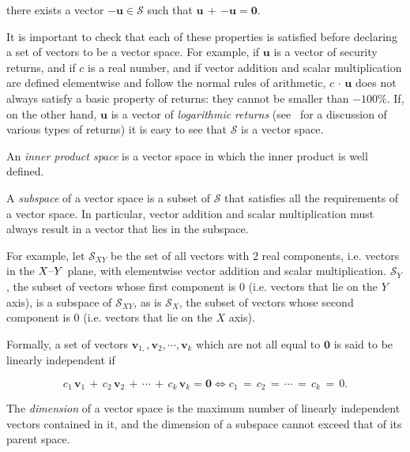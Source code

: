 \documentclass[graybox,envcountchap,sectrefs]{svmono}\usepackage[]{graphicx}\usepackage[]{xcolor}
\makeatletter
\newcommand{\lyxmathsym}[1]{\ifmmode\begingroup\def\b@ld{bold}
  \text{\ifx\math@version\b@ld\bfseries\fi#1}\endgroup\else#1\fi}
\makeatother
\begin{document}
\begin{appendices}
\begin{enumerate}
there exists a vector $\mathrm{\mathbf{-u}}\in\mathcal{{S}}$ such
that $\mathrm{\mathbf{u}}\,+\,\mathrm{\mathbf{-u}}=\mathrm{\mathbf{0}}$.
\end{enumerate}
It is important to check that each of these properties is satisfied
before declaring a set of vectors to be a vector space. For example,
if $\mathrm{\mathbf{u}}$ is a vector of security returns, and if
$c$ is a real number, and if vector addition and scalar multiplication
are defined elementwise and follow the normal rules of arithmetic,
$c\,\cdotp\,\mathrm{\mathbf{u}}$ does not always satisfy a basic
property of returns: they cannot be smaller than $-100\%$. If, on
the other hand, $\mathrm{\mathbf{u}}$ is a vector of \emph{logarithmic}
\emph{returns} (see \AssetReturnsChapter\  for a discussion of various
types of returns) it is easy to see that $\mathcal{{S}}$ is a vector
space.

An \emph{inner product space} is a vector space in which the inner
product is well defined.

A \emph{subspace} of a vector space is a subset of $\mathcal{{S}}$
that satisfies all the requirements of a vector space. In particular,
vector addition and scalar multiplication must always result in a
vector that lies in the subspace. 

For example, let $\mathcal{{S}}_{XY}$ be the set of all vectors with
2 real components, i.e. vectors in the $X\lyxmathsym{–}Y$ plane,
with elementwise vector addition and scalar multiplication. $\mathcal{{S}}_{Y}$,
the subset of vectors whose first component is 0 (i.e. vectors that
lie on the $Y$ axis), is a subspace of $\mathcal{{S}}_{XY}$, as
is $\mathcal{{S}}_{X}$, the subset of vectors whose second component
is 0 (i.e. vectors that lie on the $X$ axis). 

Formally, a set of vectors $\mathrm{\mathbf{v}}_{1,},\mathrm{\mathbf{v}}_{2},\cdots,\mathrm{\mathbf{v}}_{k}$
which are not all equal to $\mathbf{0}$ is said to be linearly independent
if

\begin{equation}
c_{1}\,\mathrm{\mathbf{v}}_{1}\,+\,c_{2}\,\mathrm{\mathbf{v}}_{2}\,+\,\cdots\,+\,c_{k}\,\mathrm{\mathbf{v}}_{k}=\mathbf{0}\Longleftrightarrow c_{1}\,=\,c_{2}\,=\,\cdots\,=\,c_{k}\,=\,0.\label{eq:VectorSpaceDimension}
\end{equation}

The \emph{dimension} of a vector space is the maximum number of linearly
independent vectors contained in it, and the dimension of a subspace
cannot exceed that of its parent space. 


\end{appendices}
\end{document}
